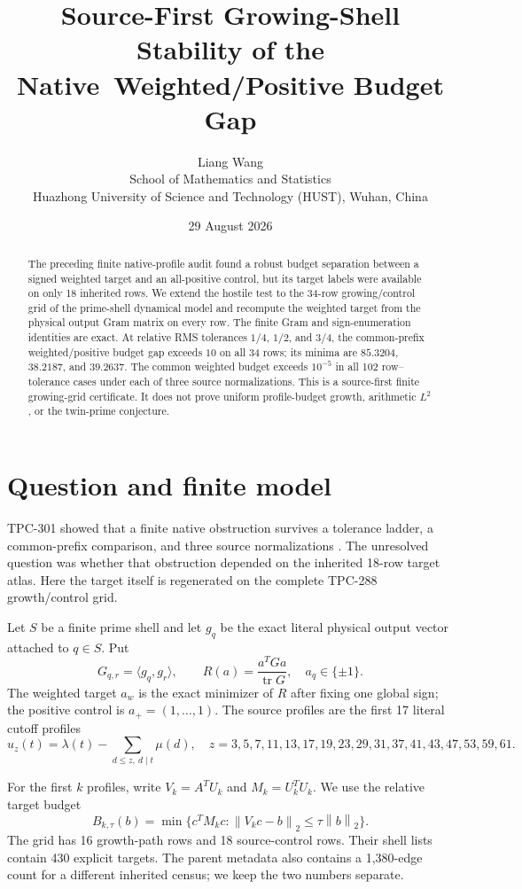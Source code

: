 \documentclass[11pt]{article}
\title{Source-First Growing-Shell Stability of the Native\
Weighted/Positive Budget Gap}
\author{Liang Wang\\
School of Mathematics and Statistics\\
Huazhong University of Science and Technology (HUST), Wuhan, China}
\date{29 August 2026}
\newcommand{\norm}[1]{\left\lVert #1\right\rVert}
\begin{document}
\maketitle

\begin{abstract}
The preceding finite native-profile audit found a robust budget separation
between a signed weighted target and an all-positive control, but its target
labels were available on only 18 inherited rows.  We extend the hostile test
to the 34-row growing/control grid of the prime-shell dynamical model and
recompute the weighted target from the physical output Gram matrix on every
row.  The finite Gram and sign-enumeration identities are exact.  At relative
RMS tolerances $1/4$, $1/2$, and $3/4$, the common-prefix weighted/positive
budget gap exceeds $10$ on all 34 rows; its minima are $85.3204$, $38.2187$,
and $39.2637$.  The common weighted budget exceeds $10^{-5}$ in all 102
row--tolerance cases under each of three source normalizations.  This is a
source-first finite growing-grid certificate.  It does not prove uniform
profile-budget growth, arithmetic $L^2$, or the twin-prime conjecture.
\end{abstract}

\section{Question and finite model}

TPC-301 showed that a finite native obstruction survives a tolerance ladder,
a common-prefix comparison, and three source normalizations \cite{tpc301}.
The unresolved question was whether that obstruction depended on the inherited
18-row target atlas.  Here the target itself is regenerated on the complete
TPC-288 growth/control grid.

Let $S$ be a finite prime shell and let $g_q$ be the exact literal physical
output vector attached to $q\in S$.  Put
\[
 G_{q,r}=\langle g_q,g_r\rangle,\qquad
 R(a)=\frac{a^TGa}{\operatorname{tr}G},\quad a_q\in\{\pm1\}.
\]
The weighted target $a_w$ is the exact minimizer of $R$ after fixing one
global sign; the positive control is $a_+=(1,\ldots,1)$.  The source profiles
are the first 17 literal cutoff profiles
\[
 u_z(t)=\lambda(t)-\sum_{d\le z,\ d\mid t}\mu(d),
 \quad z=3,5,7,11,13,17,19,23,29,31,37,41,43,47,53,59,61.
\]

For the first $k$ profiles, write $V_k=A^TU_k$ and $M_k=U_k^TU_k$.  We use
the relative target budget
\[
 B_{k,\tau}(b)=\min\{c^TM_kc:\norm{V_kc-b}_2\leq\tau\norm b_2\}.
 \tag{1}
\]
The grid has 16 growth-path rows and 18 source-control rows.  Their shell
lists contain 430 explicit targets.  The parent metadata also contains a
1,380-edge count for a different inherited census; we keep the two numbers
separate.
\end{document}
